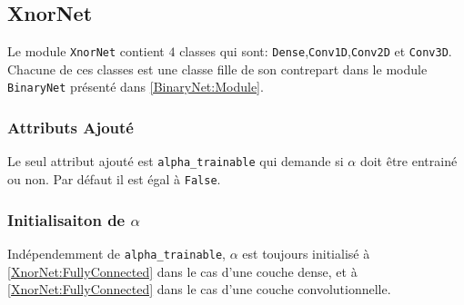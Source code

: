 \subsection{XnorNet}
Le module \texttt{XnorNet} contient $4$ classes qui sont: \texttt{Dense},\texttt{Conv1D},\texttt{Conv2D} et \texttt{Conv3D}.
\newline Chacune de ces classes est une classe fille de son contrepart dans le module \texttt{BinaryNet} présenté dans \ref{BinaryNet:Module}. 
\subsubsection{Attributs Ajouté}
Le seul attribut ajouté est \texttt{alpha\_trainable} qui demande si $\alpha$ doit être entrainé ou non. Par défaut il est égal à \texttt{False}.
\subsubsection{Initialisaiton de $\alpha$}
Indépendemment de \texttt{alpha\_trainable}, $\alpha$ est toujours initialisé à \ref{XnorNet:FullyConnected} dans le cas d'une couche dense, et à \ref{XnorNet:FullyConnected} dans le cas d'une couche convolutionnelle.
